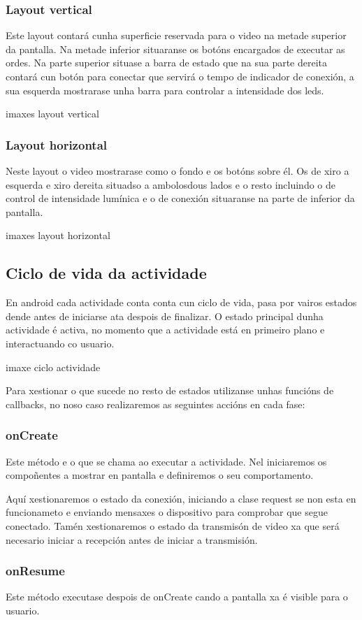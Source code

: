 \subsubsection{Layout vertical}
Este layout contará cunha superficie reservada para o video na metade superior da pantalla. Na metade inferior situaranse os botóns encargados de executar as ordes. Na parte superior situase a barra de estado que na sua parte dereita contará cun botón para conectar que servirá o tempo de indicador de conexión, a sua esquerda mostrarase unha barra para controlar a intensidade dos leds.

imaxes layout vertical
\subsubsection{Layout horizontal}
Neste layout o video mostrarase como o fondo e os botóns sobre él. Os de xiro a esquerda e xiro dereita situadso a ambolosdous lados e o resto incluindo o de control de intensidade lumínica e o de conexión situaranse na parte de inferior da pantalla.

imaxes layout horizontal
\subsection{Ciclo de vida da actividade}
En android cada actividade conta conta cun ciclo de vida, pasa por vairos estados dende antes de iniciarse ata despois de finalizar. O estado principal dunha actividade é activa, no momento que a actividade está en primeiro plano e interactuando co usuario.

imaxe ciclo actividade

Para xestionar o que sucede no resto de estados utilizanse unhas funcións de callbacks, no noso caso realizaremos as seguintes accións en cada fase:
\subsubsection{onCreate}
Este método e o que se chama ao executar a actividade. Nel iniciaremos os compoñentes a mostrar en pantalla e definiremos o seu comportamento.

Aquí xestionaremos o estado da conexión, iniciando a clase request se non esta en funcionameto e enviando mensaxes o dispositivo para comprobar que segue conectado. Tamén xestionaremos o estado da transmisón de video xa que será necesario iniciar a recepción antes de iniciar a transmisión.
\subsubsection{onResume}
Este método executase despois de onCreate cando a pantalla xa é visible para o usuario.

